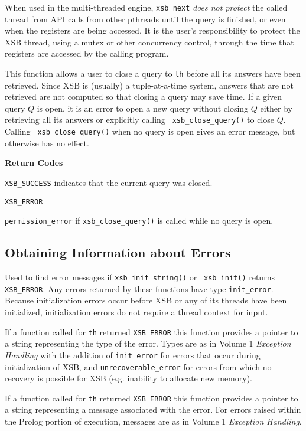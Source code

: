 \begin{description}
When used in the multi-threaded engine, {\tt xsb\_next} {\em does not
  protect} the called thread from API calls from other pthreads until
the query is finished, or even when the registers are being accessed.
It is the user's responsibility to protect the XSB thread, using a
mutex or other concurrency control, through the time that registers
are accessed by the calling program.

%
This function allows a user to close a query to {\tt th} before all
its answers have been retrieved.  Since XSB is (usually) a
tuple-at-a-time system, answers that are not retrieved are not
computed so that closing a query may save time.  If a given query $Q$
is open, it is an error to open a new query without closing $Q$ either
by retrieving all its answers or explicitly calling {\tt
  xsb\_close\_query()} to close $Q$.  Calling {\tt
  xsb\_close\_query()} when no query is open gives an error message,
but otherwise has no effect.

{\bf Return Codes}  
\bi
\item {\tt XSB\_SUCCESS} indicates that the current query was closed.
%
\item {\tt XSB\_ERROR} 
\bi
\item {\tt permission\_error} if {\tt xsb\_close\_query()} is
  called while no query is open.
\ei
\ei

\end{description}

\subsection{Obtaining Information about Errors}

\begin{description}
%
Used to find error messages if {\tt xsb\_init\_string()} or {\tt
  xsb\_init()} returns {\tt XSB\_ERROR}.  Any errors returned by these
functions have type {\tt init\_error}.  Because initialization errors
occur before XSB or any of its threads have been initialized,
initialization errors do not require a thread context for input.

%
If a function called for {\tt th} returned {\tt XSB\_ERROR} this
function provides a pointer to a string representing the type of the
error.  Types are as in Volume 1 {\em Exception Handling} with the
addition of {\tt init\_error} for errors that occur during
initialization of XSB, and {\tt unrecoverable\_error} for errors from
which no recovery is possible for XSB (e.g. inability to allocate new
memory).  

%
If a function called for {\tt th} returned {\tt XSB\_ERROR} this
function provides a pointer to a string representing a message
associated with the error.  For errors raised within the Prolog
portion of execution, messages are as in Volume 1 {\em Exception
  Handling}.

\end{description}

